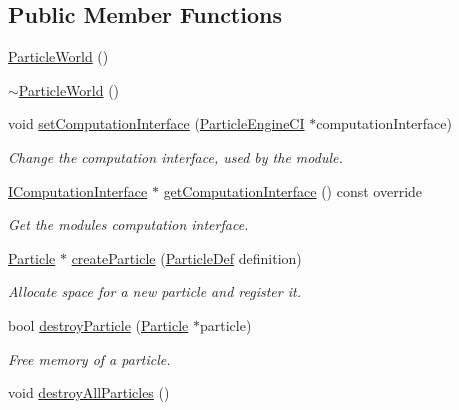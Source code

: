 \subsection*{Public Member Functions}
\begin{DoxyCompactItemize}
\item 
\mbox{\hyperlink{classr3_1_1_particle_world_a5cd4bf68559cd0e1194420d3233b095e}{Particle\+World}} ()
\item 
\mbox{\hyperlink{classr3_1_1_particle_world_a3a6d6f87b726156c41d4282c6dbb1e48}{$\sim$\+Particle\+World}} ()
\item 
void \mbox{\hyperlink{classr3_1_1_particle_world_adf5630d53659e9ced254d33990f15a9d}{set\+Computation\+Interface}} (\mbox{\hyperlink{classr3_1_1_particle_engine_c_i}{Particle\+Engine\+CI}} $\ast$computation\+Interface)
\begin{DoxyCompactList}\small\item\em Change the computation interface, used by the module. \end{DoxyCompactList}\item 
\mbox{\hyperlink{classr3_1_1_i_computation_interface}{I\+Computation\+Interface}} $\ast$ \mbox{\hyperlink{classr3_1_1_particle_world_a1e806bf89ec6445a54b9534f1efc081f}{get\+Computation\+Interface}} () const override
\begin{DoxyCompactList}\small\item\em Get the module\textquotesingle{}s computation interface. \end{DoxyCompactList}\item 
\mbox{\hyperlink{classr3_1_1_particle}{Particle}} $\ast$ \mbox{\hyperlink{classr3_1_1_particle_world_a5df8f4d242ab19e7e1a9830ef6131c3c}{create\+Particle}} (\mbox{\hyperlink{structr3_1_1_particle_def}{Particle\+Def}} definition)
\begin{DoxyCompactList}\small\item\em Allocate space for a new particle and register it. \end{DoxyCompactList}\item 
bool \mbox{\hyperlink{classr3_1_1_particle_world_a1802231868ed6d99dd677ef71328781a}{destroy\+Particle}} (\mbox{\hyperlink{classr3_1_1_particle}{Particle}} $\ast$particle)
\begin{DoxyCompactList}\small\item\em Free memory of a particle. \end{DoxyCompactList}\item 
void \mbox{\hyperlink{classr3_1_1_particle_world_aa061b4eab09216fb7e3a8d08cbdb6dd2}{destroy\+All\+Particles}} ()

\end{DoxyCompactItemize}
